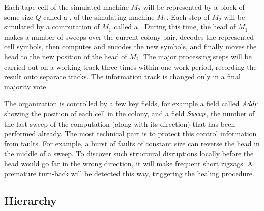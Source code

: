 \documentclass[11pt]{memoir}
\theoremstyle{definition} %
\newcommand{\fld}[1]{\ensuremath{\textit{#1\/}}}
\newcommand{\Q}{Q} %
\newcommand{\Addr}{\fld{Addr}}
\newcommand{\Sweep}{\fld{Sweep}} %
\begin{document}
Each tape cell of the simulated machine \( M_{2} \) will be represented by a block of
some size \( \Q \) called a , of the simulating machine \( M_{1} \).
Each step of \( M_{2} \) will be simulated by a computation of \( M_{1} \) called
a .
During this time, the head of \( M_{1} \) makes a number of sweeps over the
current colony-pair, decodes the represented cell symbols,
then computes and encodes the new symbols, and finally moves the head 
to the new position of the head of \( M_{2} \).
The major processing steps will be 
carried out on a working track three times within one work period,
recording the result onto separate tracks.
The information track is changed only in a final majority vote.

The organization is controlled by a few key fields, for example a field
called \( \Addr \) showing the position of each cell in the colony, and a field
\( \Sweep \), the number of the last sweep of the computation (along with its direction)
that has been performed already.
The most technical part is to protect this control information from faults.
For example, a burst of faults of constant size can reverse the head in the middle of a sweep.
To discover such structural disruptions locally before
the head would go far in the wrong direction, it will make frequent short zigzags.
A premature turn-back will be detected this way, triggering the healing procedure.


\subsection{Hierarchy}\label{sec:hier}
\end{document}

